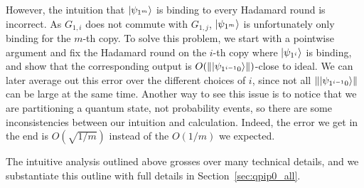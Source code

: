 However, the intuition that $\ket{\psi_{1^m}}$ is binding to every Hadamard round is incorrect. As $G_{1,i}$ does not commute with $G_{1,j}$, $\ket{\psi_{1^m}}$ is unfortunately only binding for the $m$-th copy.
To solve this problem, we start with a pointwise argument and fix the Hadamard round on the $i$-th copy where $\ket{\psi_{1^i}}$ is binding,
and show that the corresponding output is $O(\left\lVert\ket{\psi_{1^{i-1}0}}\right\rVert)$-close to ideal.
We can later average out this error over the different choices of $i$, since not all $\left\lVert\ket{\psi_{1^{i-1}0}}\right\rVert$ can be large at the same time. Another way to see this issue is to notice that we are partitioning a quantum state, not probability events, so there are some inconsistencies between our intuition and calculation. Indeed, the error we get in the end is $O(\sqrt{1/m})$ instead of the $O(1/m)$ we expected. 


The intuitive analysis outlined above grosses over many technical details, and we substantiate this outline with full details in 
Section~\ref{sec:qpip0_all}.


